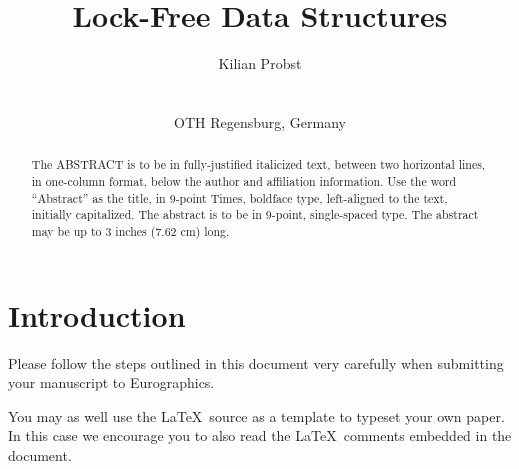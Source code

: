 \title{Lock-Free Data Structures }

\author[Kilian Probst]
{\parbox{\textwidth}{\centering Kilian Probst}
        \\
{\parbox{\textwidth}{\centering OTH Regensburg, Germany}}
}

%





\maketitle
\begin{abstract}
   The ABSTRACT is to be in fully-justified italicized text,
   between two horizontal lines,
   in one-column format,
   below the author and affiliation information.
   Use the word ``Abstract'' as the title, in 9-point Times, boldface type,
   left-aligned to the text, initially capitalized.
   The abstract is to be in 9-point, single-spaced type.
   The abstract may be up to 3 inches (7.62 cm) long.
\end{abstract}

\section{Introduction}

Please follow the steps outlined in this document very carefully when
submitting your manuscript to Eurographics.

You may as well use the \LaTeX\ source as a template to typeset your own
paper. In this case we encourage you to also read the \LaTeX\ comments
embedded in the document.

